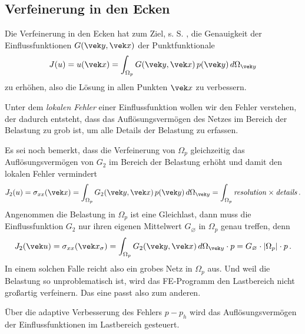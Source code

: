 {{{%
{\textcolor{blau2}{\subsection*{Verfeinerung in den Ecken}}}
Die Verfeinerung in den Ecken hat zum Ziel, s. S. \pageref{SingInf}, die Genauigkeit der Einflussfunktionen $G(\vek y,\vek x)$ der Punktfunktionale
\begin{align}
J(u) = u(\vek x) =  \int_{\Omega_p} G(\vek y,\vek x)\,p(\vek y)\,d\Omega_{\vek y}
\end{align}
zu erh\"{o}hen, also die L\"{o}sung in allen Punkten $\vek x$ zu verbessern.

Unter dem {\em lokalen Fehler\/} einer Einflussfunktion wollen wir den Fehler verstehen, der dadurch entsteht, dass das Aufl\"{o}sungsverm\"{o}gen des Netzes im Bereich der Belastung zu grob ist, um alle Details der Belastung zu erfassen.


Es sei noch bemerkt, dass die Verfeinerung von $\Omega_p$  gleichzeitig das Aufl\"{o}sungsverm\"{o}gen von $G_2$ im Bereich der Belastung erh\"{o}ht und damit den lokalen Fehler vermindert
\begin{align}\label{Eq165}
J_2(u) = \sigma_{xx}(\vek x) = \int_{\Omega_p} G_2(\vek y,\vek x)\,p(\vek y)\,d\Omega_{\vek y} = \int_{\Omega_p} \text{{\em resolution\/}} \times \text{{\em details\/}}\,.
\end{align}
Angenommen die Belastung in $\Omega_p $ ist eine Gleichlast, dann muss die Einflussfunktion $G_2$  nur ihren eigenen Mittelwert $G_\varnothing$ in $\Omega_p$ genau treffen, denn
\begin{align}
J_2(\vek u) = \sigma_{xx}(\vek x_\sigma) = \int_{\Omega_p} G_2(\vek y,\vek x)\,d\Omega_{\vek y} \cdot  p = G_\varnothing \cdot |\Omega_p|\cdot p\,.
\end{align}
In einem solchen Falle reicht also ein grobes Netz in $\Omega_p $ aus. Und weil die Belastung so unproblematisch ist, wird das FE-Programm den Lastbereich nicht gro{\ss}artig verfeinern. Das eine passt also zum anderen.\\

\hspace*{-12pt}\colorbox{hellgrau}{\parbox{0.98\textwidth}{
\"{U}ber die adaptive Verbesserung des Fehlers $p - p_h$  wird das Aufl\"{o}sungsverm\"{o}gen der Einflussfunktionen im Lastbereich gesteuert.}}\\

}}}
